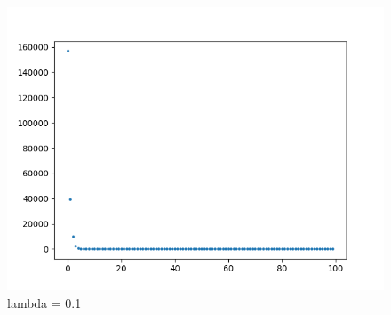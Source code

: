 \documentclass{xjtureport}
\begin{document}
\begin{figure}[H]
    \centering
    \includegraphics[scale = 0.6]{figures/ADMM_lam=0.1.png}
    \caption{lambda = 0.1}
    \end{figure}
\end{document}
